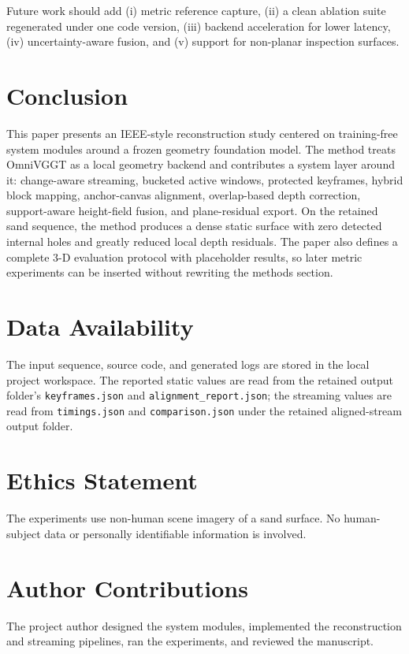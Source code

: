 \documentclass[conference]{IEEEtran}
\begin{document}
Future work should add (i) metric reference capture, (ii) a clean ablation suite regenerated under one code version, (iii) backend acceleration for lower latency, (iv) uncertainty-aware fusion, and (v) support for non-planar inspection surfaces.

\section{Conclusion}
This paper presents an IEEE-style reconstruction study centered on training-free system modules around a frozen geometry foundation model. The method treats OmniVGGT as a local geometry backend and contributes a system layer around it: change-aware streaming, bucketed active windows, protected keyframes, hybrid block mapping, anchor-canvas alignment, overlap-based depth correction, support-aware height-field fusion, and plane-residual export. On the retained sand sequence, the method produces a dense static surface with zero detected internal holes and greatly reduced local depth residuals. The paper also defines a complete 3-D evaluation protocol with placeholder results, so later metric experiments can be inserted without rewriting the methods section.

\section*{Data Availability}
The input sequence, source code, and generated logs are stored in the local project workspace. The reported static values are read from the retained output folder's \texttt{keyframes.json} and \texttt{alignment\_report.json}; the streaming values are read from \texttt{timings.json} and \texttt{comparison.json} under the retained aligned-stream output folder.

\section*{Ethics Statement}
The experiments use non-human scene imagery of a sand surface. No human-subject data or personally identifiable information is involved.

\section*{Author Contributions}
The project author designed the system modules, implemented the reconstruction and streaming pipelines, ran the experiments, and reviewed the manuscript.
\end{document}
